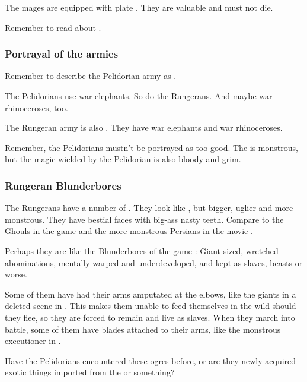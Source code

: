 The \ishrah{} mages are equipped with plate \armour. 
They are valuable and must not die. 

Remember to read about . 









\subsubsection{Portrayal of the armies}
Remember to describe the Pelidorian army as . 

The Pelidorians use war elephants. 
So do the Rungerans. 
And maybe war rhinoceroses, too. 

The Rungeran army is also . 
They have war elephants and war rhinoceroses. 

Remember, the Pelidorians mustn't be portrayed as too good. 
The  is monstrous, but the magic wielded by the Pelidorian \ishrah{} is also bloody and grim.





\subsubsection{Rungeran Blunderbores}
The Rungerans have a number of \nephil {}. 
They look like \humans, but bigger, uglier and more monstrous. 
They have bestial faces with big-ass nasty teeth. 
Compare to the Ghouls in the game \cite{VideoGame:WarcraftIII} and the more monstrous Persians in the movie \cite{Movie:300}. 

Perhaps they are like the Blunderbores of the game \cite{VideoGame:DiabloII}: 
Giant-sized, wretched abominations, mentally warped and underdeveloped, and kept as slaves, beasts or worse. 

Some of them have had their arms amputated at the elbows, like the giants in a deleted scene in \cite{Movie:300}. This makes them unable to feed themselves in the wild should they flee, so they are forced to remain and live as slaves. 
When they march into battle, some of them have blades attached to their arms, like the monstrous executioner in \cite{Movie:300}.

Have the Pelidorians encountered these ogres before, or are they newly acquired exotic things imported from the  or something?





